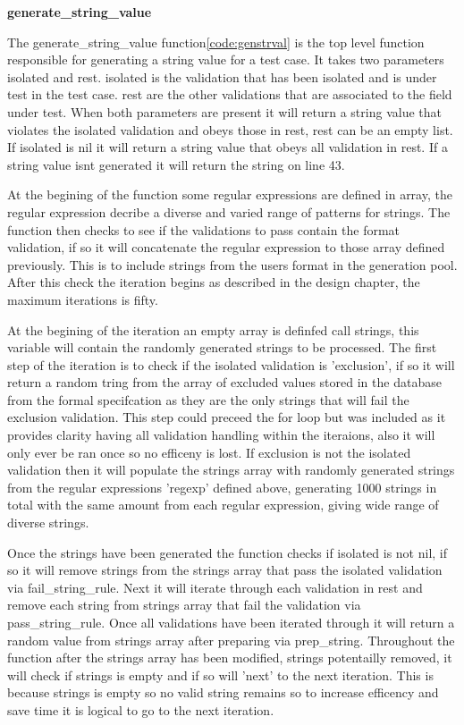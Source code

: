 \documentclass[a4paper,12pt]{article}
\begin{document}
\par \textbf{generate\_string\_value}
\par The generate\_string\_value function\ref{code:genstrval} is the top level function responsible for generating a string value for a test case. It takes two parameters isolated and rest. isolated is the validation that has been isolated and is under test in the test case. rest are the other validations that are associated to the field under test. When both parameters are present it will return a string value that violates the isolated validation and obeys those in rest, rest can be an empty list. If isolated is nil it will return a string value that obeys all validation in rest. If a string value isnt generated it will return the string on line 43. 
\par At the begining of the function some regular expressions are defined in array, the regular expression decribe a diverse and varied range of patterns for strings. The function then checks to see if the validations to pass contain the format validation, if so it will concatenate the regular expression to those array defined previously. This is to include strings from the users format in the generation pool. After this check the iteration begins as described in the design chapter, the maximum iterations is fifty.
\par At the begining of the iteration an empty array is definfed call strings, this variable will contain the randomly generated strings to be processed. The first step of the iteration is to check if the isolated validation is 'exclusion', if so it will return a random tring from the array of excluded values stored in the database from the formal specifcation as they are the only strings that will fail the exclusion validation. This step could preceed the for loop but was included as it provides clarity having all validation handling within the iteraions, also it will only ever be ran once so no efficeny is lost. If exclusion is not the isolated validation then it will populate the strings array with randomly generated strings from the regular expressions 'regexp' defined above, generating 1000 strings in total with the same amount from each regular expression, giving wide range of diverse strings.
\par Once the strings have been generated the function checks if isolated is not nil, if so it will remove strings from the strings array that pass the isolated validation via fail\_string\_rule. Next it will iterate through each validation in rest and remove each string from strings array that fail the validation via pass\_string\_rule. Once all validations have been iterated through it will return a random value from strings array after preparing via prep\_string. Throughout the function after the strings array has been modified, strings potentailly removed, it will check if strings is empty and if so will 'next' to the next iteration. This is because strings is empty so no valid string remains so to increase efficency and save time it is logical to go to the next iteration.
\end{document}
